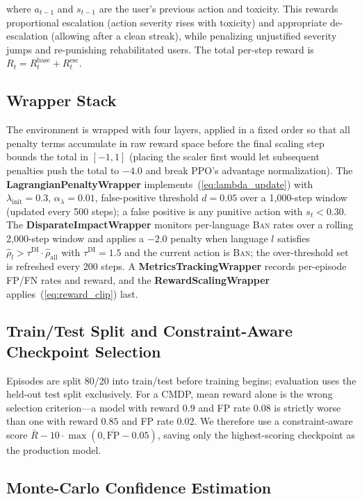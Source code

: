 \documentclass[journal]{IEEEtran}
\begin{document}
where $a_{t-1}$ and $s_{t-1}$ are the user's previous action and toxicity. This rewards
proportional escalation (action severity rises with toxicity) and appropriate de-escalation
(allowing after a clean streak), while penalizing unjustified severity jumps and
re-punishing rehabilitated users. The total per-step reward is
$R_t = R^{\text{base}}_t + R^{\text{esc}}_t$.

\subsection{Wrapper Stack}

The environment is wrapped with four layers, applied in a fixed order so that all penalty
terms accumulate in raw reward space before the final scaling step bounds the total in
$[-1,1]$ (placing the scaler first would let subsequent penalties push the total to $-4.0$
and break PPO's advantage normalization). The \textbf{LagrangianPenaltyWrapper}
implements~(\ref{eq:lambda_update}) with $\lambda_{\text{init}}=0.3$,
$\alpha_\lambda=0.01$, false-positive threshold $d=0.05$ over a 1{,}000-step window
(updated every 500 steps); a false positive is any punitive action with $s_t < 0.30$. The
\textbf{DisparateImpactWrapper} monitors per-language \textsc{Ban} rates over a rolling
2{,}000-step window and applies a $-2.0$ penalty when language $l$ satisfies
$\hat{\rho}_l > \tau^{\text{DI}} \cdot \hat{\rho}_{\text{all}}$ with $\tau^{\text{DI}}=1.5$
and the current action is \textsc{Ban}; the over-threshold set is refreshed every 200
steps. A \textbf{MetricsTrackingWrapper} records per-episode FP/FN rates and reward, and
the \textbf{RewardScalingWrapper} applies~(\ref{eq:reward_clip}) last.

\subsection{Train/Test Split and Constraint-Aware Checkpoint Selection}

Episodes are split 80/20 into train/test before training begins; evaluation uses the
held-out test split exclusively. For a CMDP, mean reward alone is the wrong selection
criterion---a model with reward $0.9$ and FP rate $0.08$ is strictly worse than one with
reward $0.85$ and FP rate $0.02$. We therefore use a constraint-aware score
$\bar{R} - 10\cdot\max(0, \overline{\text{FP}} - 0.05)$, saving only the highest-scoring
checkpoint as the production model.

\subsection{Monte-Carlo Confidence Estimation}
\end{document}

